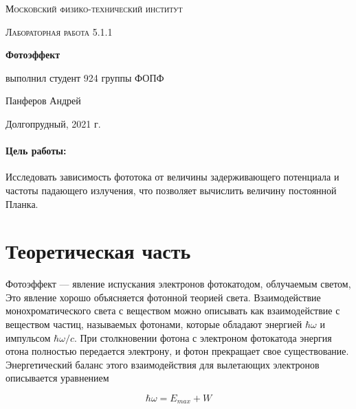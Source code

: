 \documentclass[a4paper, 12pt]{article}
\begin{document}
	
\begin{titlepage}
	\centering
	\vspace{5cm}
	{\scshape\LARGE Московский физико-технический институт \par}
	\vspace{4cm}
	{\scshape\Large Лабораторная работа 5.1.1 \par}
	\vspace{1cm}
	{\huge\bfseries Фотоэффект \par}
	\vspace{1cm}
	\vfill
\begin{flushright}
	{\large выполнил студент 924 группы ФОПФ}\par
	\vspace{0.3cm}
	{\LARGE Панферов Андрей}
\end{flushright}
	

	\vfill

	Долгопрудный, 2021 г.
\end{titlepage}

    \paragraph*{Цель работы:} Исследовать зависимость фототока от величины задерживающего потенциала и частоты падающего излучения, что позволяет вычислить величину постоянной Планка.

    \section*{Теоретическая часть}

    Фотоэффект --- явление испускания электронов фотокатодом, облучаемым светом,  Это явление хорошо объясняется фотонной теорией света. Взаимодействие монохроматического света с веществом можно описывать
	как взаимодействие с веществом частиц, называемых фотонами, которые обладают энергией $ \hbar \omega $ и импульсом $ \hbar\omega/c $. При столкновении фотона с электроном фотокатода энергия отона полностью передается электрону, и фотон прекращает свое существование. Энергетический баланс этого взаимодействия для вылетающих электронов
	описывается уравнением
	
	\begin{equation}\label{energy balance}
	\hbar \omega = E_{max} + W
	\end{equation}
	
\end{document}
